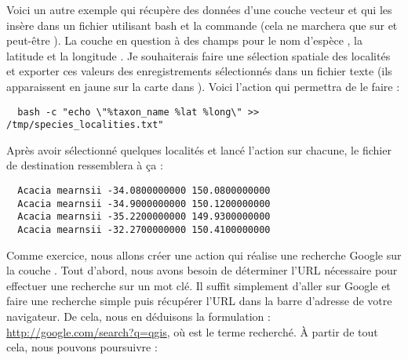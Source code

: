 Voici un autre exemple qui récupère des données d'une couche vecteur et qui les 
insère dans un fichier utilisant bash et la commande  (cela ne 
marchera que sur \nix et peut-être \osx). La couche en question à des champs 
pour le nom d'espèce , la latitude  et la 
longitude . Je souhaiterais faire une sélection spatiale des 
localités et exporter ces valeurs des enregistrements sélectionnés dans un 
fichier texte (ils apparaissent en jaune sur la carte dans \qg). Voici l'action 
qui permettra de le faire :

\begin{verbatim}
  bash -c "echo \"%taxon_name %lat %long\" >> /tmp/species_localities.txt"
\end{verbatim}

Après avoir sélectionné quelques localités et lancé l'action sur chacune, le fichier de destination ressemblera à ça :

\begin{verbatim}
  Acacia mearnsii -34.0800000000 150.0800000000
  Acacia mearnsii -34.9000000000 150.1200000000
  Acacia mearnsii -35.2200000000 149.9300000000
  Acacia mearnsii -32.2700000000 150.4100000000
\end{verbatim}

Comme exercice, nous allons créer une action qui réalise une recherche Google 
sur la couche . Tout d'abord, nous avons besoin de déterminer 
l'URL nécessaire pour effectuer une recherche sur un mot clé. Il suffit 
simplement d'aller sur Google et faire une recherche simple puis récupérer 
l'URL dans la barre d'adresse de votre navigateur. De cela, nous en déduisons 
la formulation : \url{http://google.com/search?q=qgis}, où  est 
le terme recherché. À partir de tout cela, nous pouvons poursuivre :

